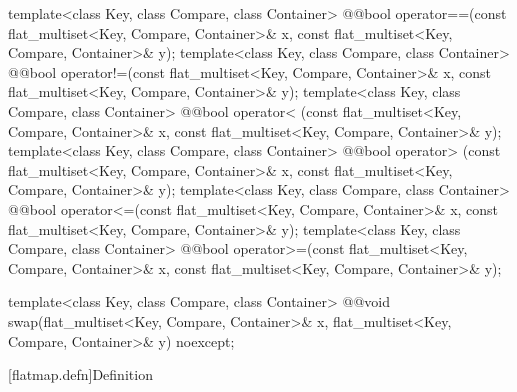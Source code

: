 \begin{codeblock}
{  template<class Key, class Compare, class Container>
    @@bool operator==(const flat_multiset<Key, Compare, Container>& x,
                              const flat_multiset<Key, Compare, Container>& y);
  template<class Key, class Compare, class Container>
    @@bool operator!=(const flat_multiset<Key, Compare, Container>& x,
                              const flat_multiset<Key, Compare, Container>& y);
  template<class Key, class Compare, class Container>
    @@bool operator< (const flat_multiset<Key, Compare, Container>& x,
                              const flat_multiset<Key, Compare, Container>& y);
  template<class Key, class Compare, class Container>
    @@bool operator> (const flat_multiset<Key, Compare, Container>& x,
                              const flat_multiset<Key, Compare, Container>& y);
  template<class Key, class Compare, class Container>
    @@bool operator<=(const flat_multiset<Key, Compare, Container>& x,
                              const flat_multiset<Key, Compare, Container>& y);
  template<class Key, class Compare, class Container>
    @@bool operator>=(const flat_multiset<Key, Compare, Container>& x,
                              const flat_multiset<Key, Compare, Container>& y);

  template<class Key, class Compare, class Container>
    @@void swap(flat_multiset<Key, Compare, Container>& x,
                        flat_multiset<Key, Compare, Container>& y) noexcept;
}
\end{codeblock}

\noindent\makebox[\linewidth]{\rule{\textwidth}{0.4pt}}

\setcounter{subsection}{9}
[flatmap.defn]{Definition}

